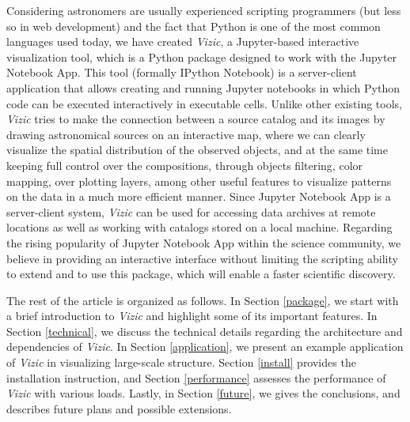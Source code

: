 \documentclass[5p,authoryear]{elsarticle}
\begin{document}
Considering astronomers are usually experienced scripting programmers (but less so in web development) and the fact that Python is one of the most common languages used today, we have created \textit{Vizic}, a Jupyter-based interactive visualization tool, which is a Python package designed to work with the Jupyter Notebook App.
This tool (formally IPython \citep{ipython} Notebook) is a server-client application that allows creating and running Jupyter notebooks in which Python code can be executed interactively in executable cells. Unlike other existing tools, \textit{Vizic} tries to make the connection between a source catalog and its images by drawing astronomical sources on an interactive map, where we can clearly visualize the spatial distribution of the observed objects, and at the same time keeping full control over the compositions, through objects filtering, color mapping, over plotting layers, among other useful features to visualize patterns on the data in a much more efficient manner.
Since Jupyter Notebook App is a server-client system, \textit{Vizic} can be used for accessing data archives at remote locations as well as working with catalogs stored on a local machine. Regarding the rising popularity of Jupyter Notebook App within the science community, we believe in providing an interactive interface without limiting the scripting ability to extend and to use this package, which will enable a faster scientific discovery.

The rest of the article is organized as follows. In Section \ref{package}, we start with a brief introduction to \textit{Vizic} and highlight some of its important features.
In Section \ref{technical}, we discuss the technical details regarding the architecture and dependencies of \textit{Vizic}.
In Section \ref{application}, we present an example application of \textit{Vizic} in visualizing large-scale structure.
Section \ref{install} provides the installation instruction, and Section \ref{performance} assesses the performance of \textit{Vizic} with various loads.
Lastly, in Section \ref{future}, we gives the conclusions, and describes future plans and possible extensions.
\end{document}

